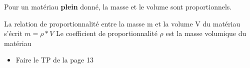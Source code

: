 \documentclass[a4paper,12pt]{article}
\begin{document}
Pour un matériau \textbf{plein} donné, la masse et le volume sont proportionnels. 
  
\begin{tcolorbox}
  La relation de proportionnalité entre la masse m et la volume V du matériau s'écrit
  \(m = \rho * V\)
  Le coefficient de proportionnalité \(\rho\) est la masse volumique du matériau
\end{tcolorbox}


\begin{tcolorbox}[colback=blue!10!white, colframe=blue!75!black, title=Exemples - Application]
  \begin{itemize}[noitemsep]
    \item Faire le TP de la page 13
  \end{itemize}
\end{tcolorbox}
\end{document}
